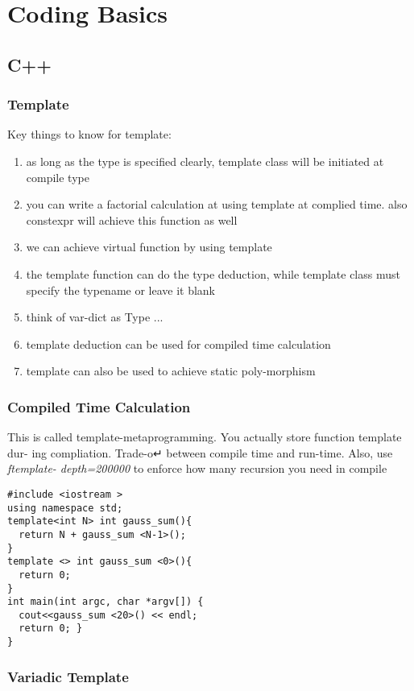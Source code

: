 \newpage
\section{Coding Basics}
\subsection{C++}
\subsubsection{Template}

Key things to know for template:
\begin{enumerate}
\item as long as the type is specified clearly, template class will be initiated at compile type
\item you can write a factorial calculation at using template at complied time. also {\color{blue}constexpr} will achieve this function as well
\item we can achieve virtual function by using template
\item the template function can do the type deduction, while template class must specify the typename or leave it blank
\item think of var-dict as Type ...
\item template deduction can be used for compiled time calculation
\item template can also be used to achieve static poly-morphism
\end{enumerate}

\subsubsection{Compiled Time Calculation}
This is called template-metaprogramming. You actually store function template dur- ing compliation. Trade-o↵ between compile time and run-time. Also, use \textit{ftemplate- depth=200000} to enforce how many recursion you need in compile

\begin{lstlisting}
#include <iostream >
using namespace std;
template<int N> int gauss_sum(){
  return N + gauss_sum <N-1>();
}
template <> int gauss_sum <0>(){
  return 0;
}
int main(int argc, char *argv[]) {
  cout<<gauss_sum <20>() << endl;
  return 0; }
}
\end{lstlisting}

\subsubsection{Variadic Template}

